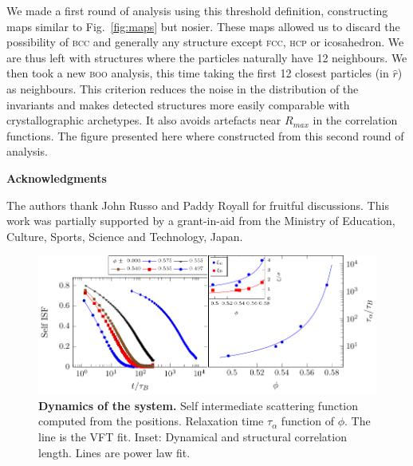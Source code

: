 We made a first round of analysis using this threshold definition, constructing maps similar to Fig.~\ref{fig:maps} but nosier. These maps allowed us to discard the possibility of \textsc{bcc} and generally any structure except \textsc{fcc, hcp} or icosahedron. We are thus left with structures where the particles naturally have 12 neighbours. We then took a new \textsc{boo} analysis, this time taking the first 12 closest particles (in $\hat{r}$) as neighbours. This criterion reduces the noise in the distribution of the invariants and makes detected structures more easily comparable with crystallographic archetypes. It also avoids artefacts near $R_{max}$ in the correlation functions. The figure presented here where constructed from this second round of analysis.


%


\vspace{2cm}
\noindent
\textbf{Acknowledgments}

\noindent
The authors thank John Russo and Paddy Royall for fruitful discussions. 
This work was partially supported by a grant-in-aid from the 
Ministry of Education, Culture, Sports, Science and Technology, Japan. 

\clearpage

\begin{figure}
\begin{center}
\includegraphics{generate_figures-figure0.pdf}
\end{center}
\caption{\textbf{Dynamics of the system.} Self intermediate scattering function computed from the positions. Relaxation time $\tau_\alpha$ function of $\phi$. The line is the VFT fit. Inset: Dynamical and structural correlation length. Lines are power law fit.}
	\label{fig:vft}
\end{figure}

\clearpage

